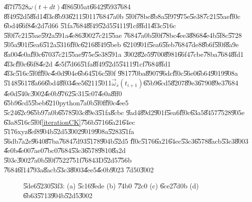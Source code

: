 \documentclass[12pt,a4paper]{article}
\begin{document}
\U{4f7f}\U{7528}$\omega (t+dt)$\U{4f86}\U{505a}t\U{6642}\U{9593}\U{7684}%
\U{8f49}\U{52d5}\U{8fd1}\U{4f3c}\U{8b93}\U{6211}\U{5011}\U{7684}\U{7a0b}%
\U{5f0f}\U{78bc}\U{8b8a}\U{5f97}\U{975e}\U{5e38}\U{7c21}\U{55ae}\U{ff0c}%
\U{6bd4}\U{66f8}\U{4e2d}\cite[Page 301, Equation 10.24]{titterton}\U{7d66}%
\U{51fa}\U{7684}\U{8f49}\U{52d5}\U{5411}\U{91cf}\U{8fd1}\U{4f3c}\U{516c}%
\U{5f0f}\U{7c21}\U{55ae}\U{592a}\U{591a}\U{4e86}\U{3002}\U{7c21}\U{55ae}%
\U{7684}\U{7a0b}\U{5f0f}\U{78bc}\U{4ee3}\U{8868}\U{4e4b}\U{5f8c}\U{5728}%
\U{505a}\U{901f}\U{5ea6}\U{512a}\U{5316}\U{ff0c}\U{6216}\U{8f49}\U{5beb}%
\U{6210}\U{901f}\U{5ea6}\U{5feb}\U{7684}\U{7de8}\U{8b6f}\U{5f0f}\U{8a9e}%
\U{8a00}\U{4e0a}\U{ff0c}\U{6703}\U{7c21}\U{55ae}\U{975e}\U{5e38}\U{591a}%
\U{3002}\U{82e5}\U{9700}\U{8981}\U{66f4}\U{7cbe}\U{78ba}\U{7684}\U{8fd1}%
\U{4f3c}\U{ff0c}\U{66f8}\cite[Page 301, Equation 10.24]{titterton}\U{4e2d}%
\U{4e5f}\U{7d66}\U{51fa}\U{8f49}\U{52d5}\U{5411}\U{91cf}\U{7684}\U{8fd1}%
\U{4f3c}\U{516c}\U{5f0f}\U{ff0c}\U{4e0d}\U{904e}\U{6b64}\U{516c}\U{5f0f}%
\U{9817}\U{70ba}\U{8907}\U{96dc}\U{ff0c}\U{56e0}\U{6b64}\U{9019}\U{908a}%
\U{5148}\U{5617}\U{8a66}\U{6bd4}\U{8f03}\U{4ee5}\U{6211}\U{5011}$\vec{\omega}%
_{s}(t_{i+1})$\U{65b9}\U{6cd5}\U{8207}\U{89e3}\U{6790}\U{89e3}\U{7684}%
\U{4e0d}\U{540c}\U{3002}\U{4e0b}\U{9762}\U{5c31}\U{5c07}\U{4e0a}\U{8ff0}%
\U{65b9}\U{6cd5}\U{5beb}\U{6210}python\U{7a0b}\U{5f0f}\U{ff0c}\U{4ee5}%
\U{5c24}\U{62c9}\U{65b9}\U{7a0b}\U{6578}\U{503c}\U{89e3}\U{51fa}\U{8cbc}%
\U{9ad4}\U{89d2}\U{901f}\U{5ea6}\U{ff0c}\U{63a5}\U{8457}\U{7528}\U{905e}%
\U{63a8}\U{516c}\U{5f0f}\ref{iterationCK}\U{756b}\U{5716}\U{6a21}\U{64ec}%
\U{5176}xyz\U{8ef8}\U{904b}\U{52d5}\U{3002}\U{9019}\U{908a}\U{5283}\U{51fa}%
\U{56db}\U{7a2e}\U{9640}\U{87ba}\U{7684}\U{7d93}\U{5178}\U{904b}\U{52d5}%
\U{ff0c}\U{5176}\U{6a21}\U{64ec}\U{53c3}\U{6578}\U{8acb}\U{53c3}\U{8003}%
\U{4e0b}\U{4e00}\U{7ae0}\U{7bc0}\U{7684}\U{53c3}\U{6578}\U{9810}\U{8a2d}%
\U{503c}\U{3002}\U{7a0b}\U{5f0f}\U{7522}\U{751f}\U{7684}3D\U{52d5}\U{756b}%
\U{7684}\U{6f14}\U{793a}\U{8acb}\U{53c3}\U{8003}\U{4ee5}\U{4e0b}\U{9023}%
\U{7d50}\U{3002}

\begin{center}
\href{http://tinypic.com/r/wk20ch/8}{\underline{\color{blue}%
}}
\end{center}

\begin{figure}[th]
\caption{{}\U{5de6}\U{5230}\U{53f3}: (a) \U{5c16}\U{9ede} (b) \U{74b0}%
\U{72c0} (c) \U{6ce2}\U{7d0b} (d) \U{6b63}\U{5713}\U{904b}\U{52d5}\U{3002}}
\label{FourClassics}
\begin{center}
\fbox{\scalebox{1.2}[1.2]{}}
\end{center}
\end{figure}
\end{document}
